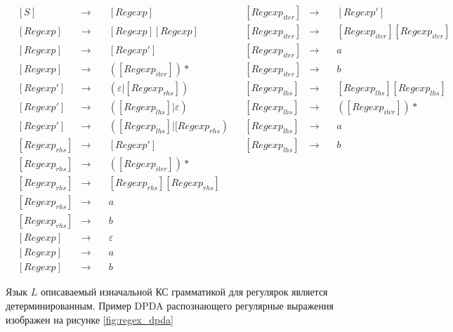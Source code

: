 \documentclass[a4paper, 14pt]{article}
\begin{document}
$$
\begin{aligned}
  &[S] &\rightarrow \quad &{[Regexp]} & &[Regexp_{iter}] &\rightarrow \quad  &[Regexp'] \\
  &[Regexp] &\rightarrow \quad &{[Regexp][Regexp]} & &[Regexp_{iter}] &\rightarrow \quad &[Regexp_{iter}][Regexp_{iter}] \\ 
  &[Regexp] &\rightarrow \quad &{[Regexp']} & &[Regexp_{iter}] &\rightarrow \quad &a \\
  &[Regexp] &\rightarrow \quad &{([Regexp_{iter}])*} & &[Regexp_{iter}] &\rightarrow \quad &b\\
  &[Regexp'] &\rightarrow \quad &{(\varepsilon|[Regexp_{rhs}])} & &[Regexp_{lhs}] &\rightarrow \quad &{[Regexp_{lhs}][Regexp_{lhs}]} \\
  &[Regexp'] &\rightarrow \quad &{([Regexp_{lhs}]|\varepsilon)} & &[Regexp_{lhs}] &\rightarrow \quad  &{([Regexp_{iter}])*} \\
  &[Regexp'] &\rightarrow \quad &{([Regexp_{lhs}]|[Regexp_{rhs})} & &[Regexp_{lhs}] &\rightarrow \quad  &a \\
  &[Regexp_{rhs}] &\rightarrow \quad &{[Regexp']} & &[Regexp_{lhs}] &\rightarrow \quad  &b \\ 
  &[Regexp_{rhs}] &\rightarrow \quad &{([Regexp_{iter}])*} \\ 
  &[Regexp_{rhs}] &\rightarrow \quad &{[Regexp_{rhs}][Regexp_{rhs}]} \\
  &[Regexp_{rhs}] &\rightarrow \quad &a \\
  &[Regexp_{rhs}] &\rightarrow \quad &b \\
  &[Regexp] &\rightarrow \quad &\varepsilon \\
  &[Regexp] &\rightarrow \quad &a \\
  &[Regexp] &\rightarrow \quad &b 
\end{aligned}
$$

Язык $L$ описаваемый изначальной КС грамматикой для регулярок является детерминированным.
Пример DPDA распознающего регулярные выражения изображен на рисунке \ref{fig:regex_dpda} 
\end{document}
